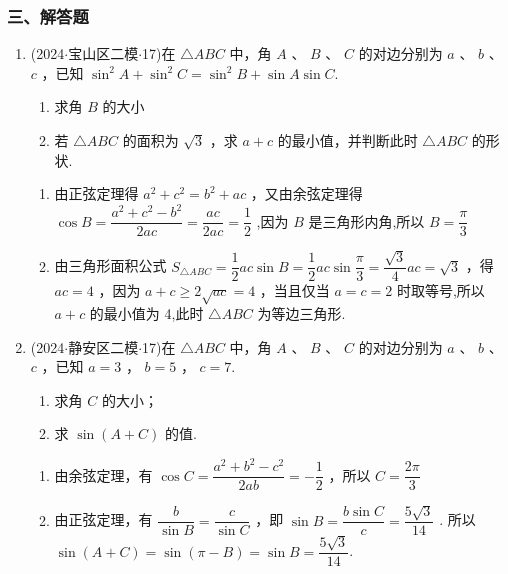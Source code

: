 \subsubsection*{三、解答题}
\begin{enumerate}
    \item (2024$\cdot$宝山区二模$\cdot$17)在 $\bigtriangleup  {ABC}$ 中，角 $A$ 、 $B$ 、 $C$ 的对边分别为 $a$ 、 $b$ 、 $c$ ，已知 ${\sin }^{2}A + {\sin }^{2}C =  {\sin }^{2}B + \sin A\sin C$.
    \begin{enumerate}
        \item 求角 $B$ 的大小
        \item 若 $\bigtriangleup  {ABC}$ 的面积为 $\sqrt{3}$ ，求 $a + c$ 的最小值，并判断此时 $\bigtriangleup  {ABC}$ 的形状.
    \end{enumerate}
    \begin{jieda}
        \begin{enumerate}
            \item 由正弦定理得 ${a}^{2} + {c}^{2} = {b}^{2} + {ac}$ ，又由余弦定理得 $\cos B  = \dfrac{{a}^{2} + {c}^{2} - {b}^{2}}{2ac} = \dfrac{ac}{2ac} = \dfrac{1}{2}$ ,因为 $B$ 是三角形内角,所以 $B = \dfrac{\pi }{3}$ 
            \item 由三角形面积公式 ${S}_{\bigtriangleup {ABC}} = \dfrac{1}{2}{ac}\sin B = \dfrac{1}{2}{ac}\sin \dfrac{\pi }{3} =  \dfrac{\sqrt{3}}{4}{ac} = \sqrt{3}$ ，得 ${ac} = 4$ ，因为 $a + c \geq  2\sqrt{ac} = 4$ ，当且仅当 $a =  c = 2$ 时取等号,所以 $a + c$ 的最小值为 4,此时 $\bigtriangleup {ABC}$ 为等边三角形.
        \end{enumerate}
    \end{jieda}
    \item (2024$\cdot$静安区二模$\cdot$17)在 $\bigtriangleup  {ABC}$ 中，角 $A$ 、 $B$ 、 $C$ 的对边分别为 $a$ 、 $b$ 、 $c$ ，已知 $a = 3$ ， $b = 5$ ， $c = 7$.
    \begin{enumerate}
        \item 求角 $C$ 的大小；
        \item 求 $\sin \left( {A + C}\right)$ 的值.
    \end{enumerate}
    \begin{jieda}
        \begin{enumerate}
            \item 由余弦定理，有 $\cos C = \dfrac{{a}^{2} + {b}^{2} - {c}^{2}}{2ab} =  - \dfrac{1}{2}$ ，所以 $C = \dfrac{2\pi }{3}$
            \item 由正弦定理，有 $\dfrac{b}{\sin B} = \dfrac{c}{\sin C}$ ，即 $\sin B = \dfrac{b\sin C}{c} =  \dfrac{5\sqrt{3}}{14}$ . 所以 $\sin \left( {A + C}\right)  = \sin \left( {\pi  - B}\right)  = \sin B = \dfrac{5\sqrt{3}}{14}$.
        \end{enumerate}
    \end{jieda}


\end{enumerate}
